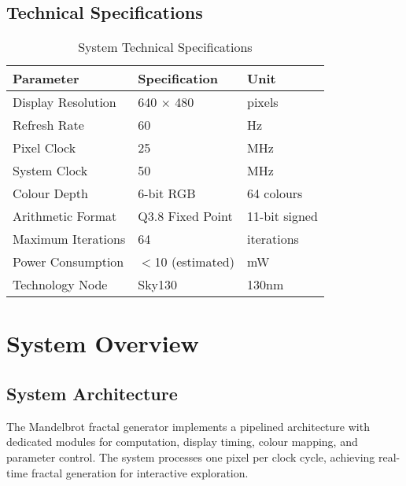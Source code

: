 \documentclass[11pt,a4paper]{article}
\begin{document}
\subsection{Technical Specifications}
\begin{table}[h]
\centering
\begin{tabularx}{\textwidth}{|l|X|l|}
\hline
\rowcolor{darkblue!20}
\textbf{Parameter} & \textbf{Specification} & \textbf{Unit} \\
\hline
Display Resolution & 640 × 480 & pixels \\
Refresh Rate & 60 & Hz \\
Pixel Clock & 25 & MHz \\
System Clock & 50 & MHz \\
Colour Depth & 6-bit RGB & 64 colours \\
Arithmetic Format & Q3.8 Fixed Point & 11-bit signed \\
Maximum Iterations & 64 & iterations \\
Power Consumption & $<$10 (estimated) & mW \\
Technology Node & Sky130 & 130nm \\
\hline
\end{tabularx}
\caption{System Technical Specifications}
\end{table}

\newpage
\section{System Overview}

\subsection{System Architecture}
The Mandelbrot fractal generator implements a pipelined architecture with dedicated modules for computation, display timing, colour mapping, and parameter control. The system processes one pixel per clock cycle, achieving real-time fractal generation for interactive exploration.
\end{document}
